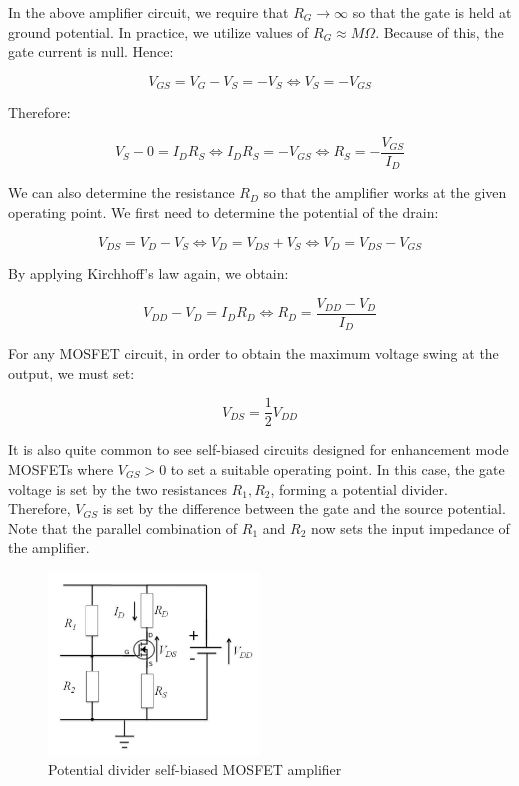 \documentclass{article}
\begin{document}
In the above amplifier circuit, we require that $R_G \to \infty$ so that the gate is held at ground potential. In practice, we utilize values of $R_G \approx M\Omega$. Because of this, the gate current is null. Hence:

\[ V_{GS} = V_G - V_S = -V_S \iff V_S = -V_{GS} \]

Therefore:

\[ V_S - 0 = I_DR_S \iff I_DR_S = -V_{GS} \iff R_S = -\frac{V_{GS}}{I_D} \]

We can also determine the resistance $R_D$ so that the amplifier works at the given operating point. We first need to determine the potential of the drain:

\[ V_{DS} = V_D - V_S \iff V_D = V_{DS} + V_S \iff V_D = V_{DS} - V_{GS} \]

By applying Kirchhoff's law again, we obtain:

\[ V_{DD} - V_D = I_DR_D \iff R_D = \frac{V_{DD} - V_D}{I_D} \]

\begin{proposition}
    For any MOSFET circuit, in order to obtain the maximum voltage swing at the output, we must set:

    \[ V_{DS} = \frac{1}{2}V_{DD} \]
\end{proposition}

It is also quite common to see self-biased circuits designed for enhancement mode MOSFETs where $V_{GS} > 0$ to set a suitable operating point. In this case, the gate voltage is set by the two resistances $R_1, R_2$, forming a potential divider. Therefore, $V_{GS}$ is set by the difference between the gate and the source potential. Note that the parallel combination of $R_1$ and $R_2$ now sets the input impedance of the amplifier.

\newpage

\begin{figure}[h]
    \centering
    \includegraphics[width = 0.5\textwidth]{images/fet7.png}
    \caption{Potential divider self-biased MOSFET amplifier}
    \label{fig:enter-label}
\end{figure}
\end{document}
